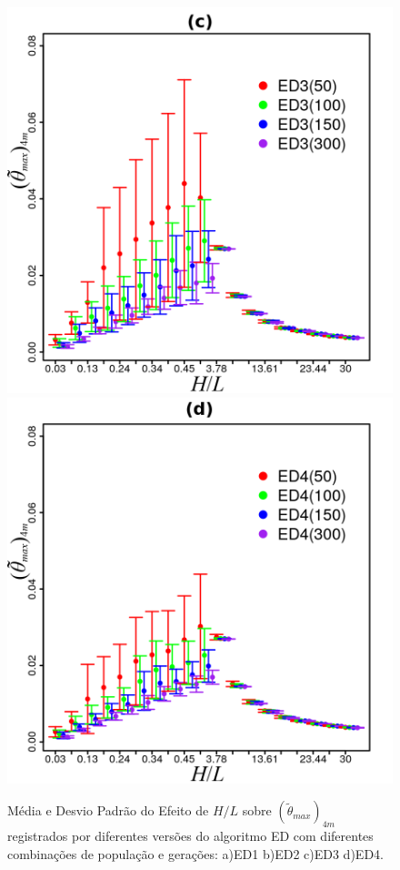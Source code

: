\documentclass[12pt,A4,A4pt]{article}
\begin{document}
\begin{figure}[htbp]
\quad
\includegraphics[scale=.98]{imgs/plot_de3_rdata_std.png}
\quad
\includegraphics[scale=.98]{imgs/plot_de4_rdata_std.png}

\caption{\fontsize{10pt}{\baselineskip}\selectfont Média e Desvio Padrão do Efeito de $H/L$ sobre $({\tilde{\theta}}_{max})_{4m}$ registrados por diferentes versões do algoritmo ED com diferentes combinações de população e gerações: a)ED1 b)ED2 c)ED3 d)ED4.}
\label{destdinner}
\end{figure}
\end{document}
